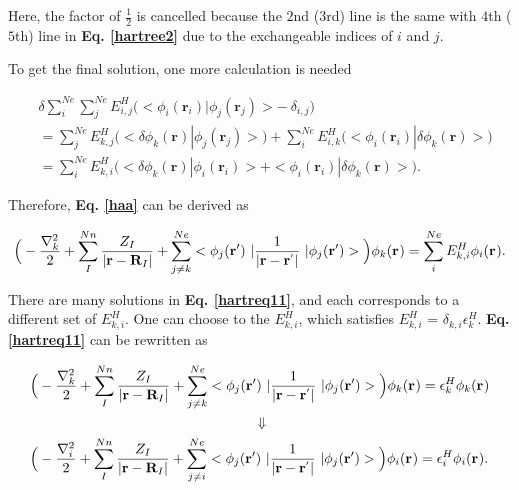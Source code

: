 \documentclass[a4paper, 12pt, titlepage,oneside,drop]{kthesis}
\begin{document}
Here, the factor of $\frac{1}{2}$ is cancelled because the $2$nd ($3$rd) line is the same with $4$th ($5$th) line in \textbf{Eq. \ref{hartree2}} due to the exchangeable indices of $i$ and $j$. 

To get the final solution, one more calculation is needed 

\begin{equation} \begin{split}\label{xixihaha}
& \delta \sum\limits_i^{{Ne}} \sum\limits_j^{{Ne}} E_{i,j}^{{H}} \Big(<\phi_{i}(\textbf{r}_{i}) | \phi_{j}(\textbf{r}_{j}) > - \ \delta_{i,j}\Big) \\
& = \sum\limits_j^{{Ne}} E_{k,j}^{{H}} \Big(< \delta \phi_{k}(\textbf{r}) | \phi_{j}(\textbf{r}_{j}) > \Big) + \sum\limits_i^{{Ne}} E_{i,k}^{{H}} \Big(<\phi_{i}(\textbf{r}_{i}) | \delta \phi_{k}(\textbf{r}) >\Big) \\
& = \sum\limits_i^{{Ne}} E_{k,i}^{{H}} \Big(< \delta \phi_{k}(\textbf{r}) | \phi_{i}(\textbf{r}_{i}) >  + <\phi_{i}(\textbf{r}_{i}) | \delta \phi_{k}(\textbf{r}) >\Big).
\end{split}
\end{equation}


Therefore, \textbf{Eq. \ref{haa}} can be derived as 

\begin{equation}\label{hartreq11}
\Big(-\frac{\nabla^{2}_{k}}{2} + \sum\limits_I^{{Nn}} \frac{Z_{I}}{|\textbf{r}-\textbf{R}_{I}|} + \sum\limits_{j \neq k}^{{Ne}}  <\bwfn<j><'>\ | \frac{1}{|\textbf{r} - \textbf{r}^{'} |} \ | \bwfn<j><'>>\Big) \bwff<k><> = \sum\limits_i^{{Ne}} E_{k,i}^{H} \bwff<i><>.
\end{equation}

There are many solutions in \textbf{Eq. \ref{hartreq11}}, and each corresponds to a different set of $E_{k,i}^{H}$. One can choose to the $E_{k,i}^{H}$, which satisfies $E_{k,i}^{H}$ = $\delta_{k,i}\epsilon_k^{{H}}$.
\textbf{Eq. \ref{hartreq11}} can be rewritten as

\begin{equation}\begin{split}\label{hartreq}
& \Big(-\frac{\nabla^{2}_{k}}{2} + \sum\limits_I^{{Nn}} \frac{Z_{I}}{|\textbf{r}-\textbf{R}_{I}|} + \sum\limits_{j \neq k}^{{Ne}}  <\bwfn<j><'>\ | \frac{1}{|\textbf{r} - \textbf{r}^{'} |} \ | \bwfn<j><'>>\Big) \bwff<k><> = \epsilon_k^{{H}} \bwff<k><>  \\
&  \qquad \qquad \qquad  \qquad \qquad \qquad \qquad \qquad  \Downarrow  \\
& \Big(-\frac{\nabla^{2}_{i}}{2} + \sum\limits_I^{{Nn}} \frac{Z_{I}}{|\textbf{r}-\textbf{R}_{I}|} + \sum\limits_{j \neq i}^{{Ne}}  <\bwfn<j><'>\ | \frac{1}{|\textbf{r} - \textbf{r}^{'} |} \ | \bwfn<j><'>>\Big) \bwff<i><> = \epsilon_i^{{H}} \bwff<i><>.  \\
\end{split}
\end{equation}
\end{document}
